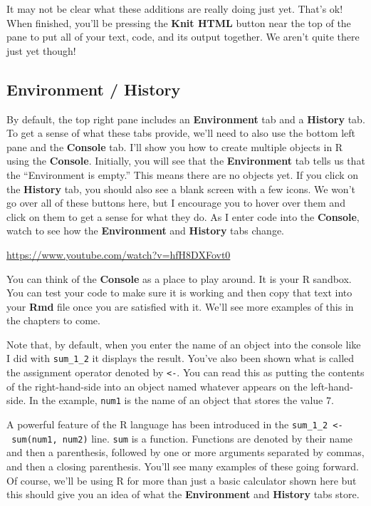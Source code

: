 \documentclass[]{tufte-book}
\begin{document}
It may not be clear what these additions are really doing just yet. That's ok! When finished, you'll be pressing the \textbf{Knit HTML} button near the top of the pane to put all of your text, code, and its output together. We aren't quite there just yet though!

\subsection{Environment / History}\label{environment-history}

By default, the top right pane includes an \textbf{Environment} tab and a \textbf{History} tab. To get a sense of what these tabs provide, we'll need to also use the bottom left pane and the \textbf{Console} tab. I'll show you how to create multiple objects in R using the \textbf{Console}. Initially, you will see that the \textbf{Environment} tab tells us that the ``Environment is empty.'' This means there are no objects yet. If you click on the \textbf{History} tab, you should also see a blank screen with a few icons. We won't go over all of these buttons here, but I encourage you to hover over them and click on them to get a sense for what they do. As I enter code into the \textbf{Console}, watch to see how the \textbf{Environment} and \textbf{History} tabs change.

\vspace{0.1in}\begin{center}\footnotesize{\url{https://www.youtube.com/watch?v=hfH8DXFovt0}}\end{center}\vspace{0.1in}

You can think of the \textbf{Console} as a place to play around. It is your R sandbox. You can test your code to make sure it is working and then copy that text into your \textbf{Rmd} file once you are satisfied with it. We'll see more examples of this in the chapters to come.

Note that, by default, when you enter the name of an object into the console like I did with \texttt{sum\_1\_2} it displays the result. You've also been shown what is called the assignment operator denoted by \texttt{\textless{}-}. You can read this as putting the contents of the right-hand-side into an object named whatever appears on the left-hand-side. In the example, \texttt{num1} is the name of an object that stores the value 7.

A powerful feature of the R language has been introduced in the \texttt{sum\_1\_2\ \textless{}-\ sum(num1,\ num2)} line. \texttt{sum} is a function. Functions are denoted by their name and then a parenthesis, followed by one or more arguments separated by commas, and then a closing parenthesis. You'll see many examples of these going forward. Of course, we'll be using R for more than just a basic calculator shown here but this should give you an idea of what the \textbf{Environment} and \textbf{History} tabs store.
\end{document}
